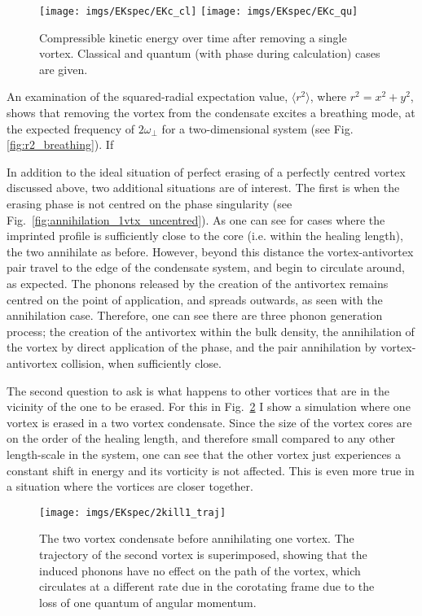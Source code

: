 \begin{figure}\label{fig:qucomp_1vtxann}
    \texttt{[image: imgs/EKspec/EKc\_cl]}
    \texttt{[image: imgs/EKspec/EKc\_qu]}
    \caption{Compressible kinetic energy over time after removing a single vortex. Classical and quantum (with phase during calculation) cases are given.}
\end{figure}

An examination of the squared-radial expectation value, $\langle r^2 \rangle$, where $r^2 = x^2 + y^2$, shows that removing the vortex from the condensate excites a breathing mode, at the expected frequency of $2\omega_\perp$ for a two-dimensional system (see Fig. \ref{fig:r2_breathing}). If

In addition to the ideal situation of perfect erasing of a perfectly centred vortex discussed above, two additional situations are of interest. The first is when the erasing phase is not centred on the phase singularity (see Fig.~\ref{fig:annihilation_1vtx_uncentred}). As one can see
for cases where the imprinted profile is sufficiently close to the core (i.e. within the healing length), the two annihilate as before. However, beyond this distance the vortex-antivortex pair travel to the edge of the condensate system, and begin to circulate around, as expected. The phonons released by the creation of the antivortex remains centred on the point of application, and spreads outwards, as seen with the annihilation case. Therefore, one can see there are three phonon generation process; the creation of the antivortex within the bulk density, the annihilation of the vortex by direct application of the phase, and the pair annihilation by vortex-antivortex collision, when sufficiently close.


The second question to ask is what happens to other vortices that are in the vicinity of the one to be erased. For this in Fig.~\ref{fig:2k1} I show a simulation where one vortex is erased in a two vortex condensate. Since the size of the vortex cores are on the order of the healing length, and therefore small compared to any other length-scale in the system, one can see that the other vortex just experiences a constant shift in energy and its vorticity is not affected. This is even more true in a situation where the vortices are closer together.


\begin{figure}
    \texttt{[image: imgs/EKspec/2kill1\_traj]}
    \caption{The two vortex condensate before annihilating one vortex. The trajectory of the second vortex is superimposed, showing that the induced phonons have no effect on the path of the vortex, which circulates at a different rate due in the corotating frame due to the loss of one quantum of angular momentum.}\label{fig:2k1}
\end{figure}

